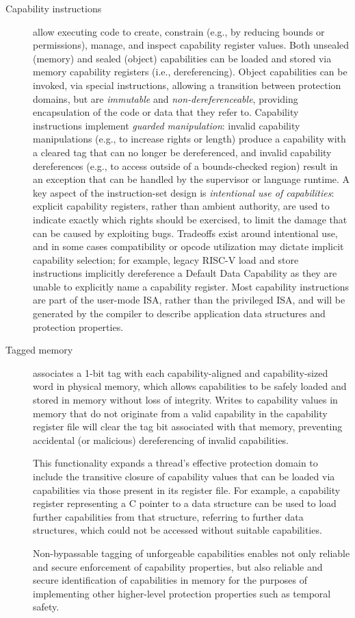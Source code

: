 \begin{description}
\item[Capability instructions] allow executing code to create, constrain (e.g., by reducing bounds or permissions), manage, and inspect capability register values.  Both unsealed (memory) and sealed (object) capabilities can be loaded and stored via memory capability registers (i.e., dereferencing).
Object capabilities can be invoked, via special instructions, allowing a transition between protection domains, but are {\em immutable} and {\em non-dereferenceable}, providing encapsulation of the code or data that they refer to.
  Capability instructions implement {\em guarded manipulation}: invalid capability manipulations (e.g., to increase rights or length) produce a capability with a cleared tag that can no longer be dereferenced, and invalid capability dereferences (e.g., to access outside of a bounds-checked region) result in an exception that can be handled by the supervisor or language runtime.
A key aspect of the instruction-set design is \textit{intentional use of
  capabilities}: explicit capability registers, rather than ambient
authority, are used to indicate exactly which rights should be exercised, to
limit the damage that can be caused by exploiting bugs.
Tradeoffs exist around intentional use, and in some cases compatibility or
opcode utilization may dictate implicit capability selection; for example,
legacy RISC-V load and store instructions implicitly dereference a Default
Data Capability as they are unable to explicitly name a capability register.
Most capability instructions are part of the user-mode ISA, rather than the privileged ISA, and will be generated by the compiler to describe application data structures and protection properties.

\item[Tagged memory] associates a 1-bit tag with each capability-aligned and capability-sized word in physical memory, which allows capabilities to be safely loaded and stored in memory without loss of integrity.
  Writes to capability values in memory that do not originate from a valid capability in the capability register file will clear the tag bit associated with that memory, preventing accidental (or malicious) dereferencing
  of invalid capabilities.

This functionality expands a thread's effective protection domain to include the transitive closure of capability values that can be loaded via capabilities via those present in its register file.  For example, a capability register representing a C pointer to a data structure can be used to load further capabilities from that structure, referring to further data structures, which could not be accessed without suitable capabilities.

Non-bypassable tagging of unforgeable capabilities enables not only reliable
and secure enforcement of capability properties, but also reliable and secure
identification of capabilities in memory for the purposes of implementing
other higher-level protection properties such as temporal safety.
\end{description}

